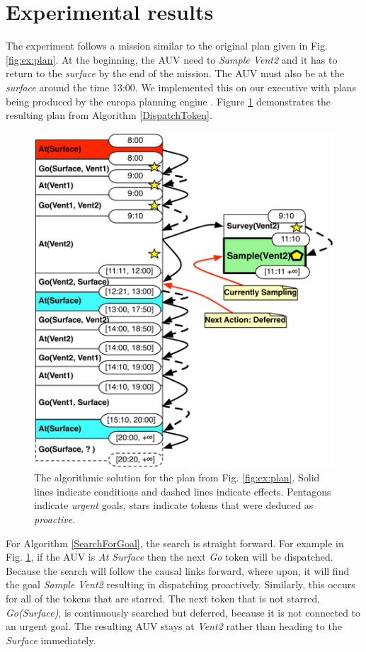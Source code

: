 \section{Experimental results}
\label{sec:exp}

The experiment follows a mission similar to the original plan given in
Fig. \ref{fig:ex:plan}. At the beginning, the AUV need to {\em Sample
  Vent2} and it has to return to the {\em surface} by the end of the
mission. The AUV must also be at the {\em surface} around the time 13:00. We
implemented this on our executive with plans being produced by the
europa planning engine \cite{frank2003}. Figure \ref{fig:ex:mixed1} 
demonstrates the resulting plan from Algorithm \ref{DispatchToken}.

\begin{figure}[!htbp]
  \centering
  \includegraphics[width=0.8\columnwidth]{figs/example_MixedInitial}
  \caption{\small The algorithmic solution for the plan from
    Fig. \ref{fig:ex:plan}. Solid lines indicate conditions and
    dashed lines indicate effects. Pentagons indicate {\em urgent}
    goals, stars indicate tokens that were deduced as {\em proactive}.}
  \label{fig:ex:mixed1}
\end{figure}

For Algorithm \ref{SearchForGoal}, the search is straight forward. For
example in Fig. \ref{fig:ex:mixed1}, if the AUV is {\em At Surface} then
the next {\em Go} token will be dispatched. Because the search will
follow the causal links forward, where upon, it will find the goal
{\em Sample Vent2} resulting in dispatching proactively.  Similarly,
this occurs for all of the tokens that are starred. The next token that is
not starred, {\em Go(Surface)}, is continuously searched but deferred,
because it is not connected to an urgent goal. The resulting AUV stays 
at {\em Vent2} rather than heading to the {\em Surface} immediately.

